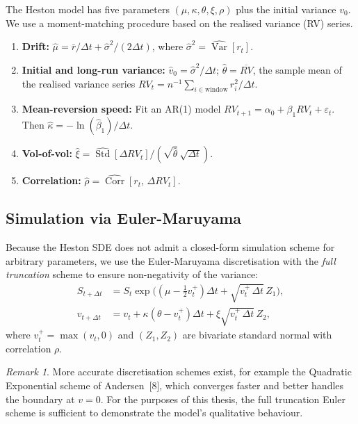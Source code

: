 \documentclass[12pt, a4paper, oneside]{report}
\theoremstyle{plain}
\theoremstyle{definition}
\theoremstyle{remark}
\newtheorem{remark}[theorem]{Remark}
\newcommand{\Var}{\operatorname{Var}}
\begin{document}
The Heston model has five parameters $(\mu, \kappa, \theta, \xi, \rho)$ plus the
initial variance $v_0$.  We use a moment-matching procedure based on the realised
variance (RV) series.

\begin{enumerate}[leftmargin=1.25cm, label=\arabic*.]
  \item \textbf{Drift:}
    $\hat\mu = \bar r / \Delta t + \hat\sigma^2 / (2\Delta t)$,
    where $\hat\sigma^2 = \widehat{\Var}[r_t]$.
  \item \textbf{Initial and long-run variance:}
    $\hat v_0 = \hat\sigma^2 / \Delta t$;\quad
    $\hat\theta = \overline{RV}$, the sample mean of the realised variance series
    $RV_t = n^{-1}\sum_{i \in \text{window}} r_i^2 / \Delta t$.
  \item \textbf{Mean-reversion speed:}
    Fit an AR(1) model $RV_{t+1} = \alpha_0 + \beta_1 RV_t + \varepsilon_t$.
    Then $\hat\kappa = -\ln(\hat\beta_1) / \Delta t$.
  \item \textbf{Vol-of-vol:}
    $\hat\xi = \widehat{\operatorname{Std}}[\Delta RV_t] / (\sqrt{\hat\theta}\,\sqrt{\Delta t})$.
  \item \textbf{Correlation:}
    $\hat\rho = \widehat{\operatorname{Corr}}[r_t,\, \Delta RV_t]$.
\end{enumerate}

\subsection{Simulation via Euler-Maruyama}

Because the Heston SDE does not admit a closed-form simulation scheme for arbitrary
parameters, we use the Euler-Maruyama discretisation with the \emph{full truncation}
scheme to ensure non-negativity of the variance:
\begin{align}
  S_{t+\Delta t} &= S_t\exp\!\bigl(
    (\mu - \tfrac{1}{2}v_t^+)\Delta t + \sqrt{v_t^+\,\Delta t}\,Z_1
  \bigr), \label{eq:heston_euler_s}\\
  v_{t+\Delta t} &= v_t + \kappa(\theta - v_t^+)\Delta t
    + \xi\sqrt{v_t^+\,\Delta t}\,Z_2, \label{eq:heston_euler_v}
\end{align}
where $v_t^+ = \max(v_t, 0)$ and $(Z_1, Z_2)$ are bivariate standard normal with
correlation $\rho$.

\begin{remark}
More accurate discretisation schemes exist, for example the Quadratic Exponential
scheme of Andersen~[8], which converges faster and better handles the boundary
at $v = 0$.  For the purposes of this thesis, the full truncation Euler scheme
is sufficient to demonstrate the model's qualitative behaviour.
\end{remark}
\end{document}

